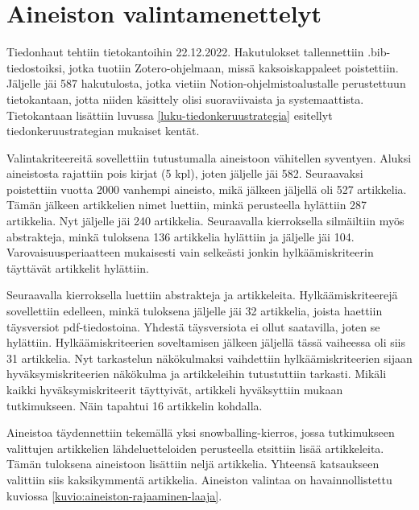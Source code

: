 \documentclass[utf8]{gradu3}
\begin{document}
\section{Aineiston valintamenettelyt}

Tiedonhaut tehtiin tietokantoihin 22.12.2022. Hakutulokset tallennettiin .bib-tiedostoiksi, jotka tuotiin Zotero-ohjelmaan, missä kaksoiskappaleet poistettiin. Jäljelle jäi 587 hakutulosta, jotka vietiin Notion-ohjelmistoalustalle perustettuun tietokantaan, jotta niiden käsittely olisi suoraviivaista ja systemaattista. Tietokantaan lisättiin luvussa \ref{luku-tiedonkeruustrategia} esitellyt tiedonkeruustrategian mukaiset kentät.

Valintakriteereitä sovellettiin tutustumalla aineistoon vähitellen syventyen. Aluksi  aineistosta rajattiin pois kirjat (5 kpl), joten jäljelle jäi 582. Seuraavaksi poistettiin vuotta 2000 vanhempi aineisto, mikä jälkeen jäljellä oli 527 artikkelia. Tämän jälkeen artikkelien nimet luettiin, minkä perusteella hylättiin 287 artikkelia. Nyt jäljelle jäi 240 artikkelia. Seuraavalla kierroksella silmäiltiin myös abstrakteja, minkä tuloksena 136 artikkelia hylättiin ja jäljelle jäi 104. Varovaisuusperiaatteen mukaisesti vain selkeästi jonkin hylkäämiskriteerin täyttävät artikkelit hylättiin.

Seuraavalla kierroksella luettiin abstrakteja ja artikkeleita. Hylkäämiskriteerejä sovellettiin edelleen, minkä tuloksena jäljelle jäi 32 artikkelia, joista haettiin täysversiot pdf-tiedostoina. Yhdestä täysversiota ei ollut saatavilla, joten se hylättiin. Hylkäämiskriteerien soveltamisen jälkeen jäljellä tässä vaiheessa oli siis 31 artikkelia. Nyt tarkastelun näkökulmaksi vaihdettiin hylkäämiskriteerien sijaan hyväksymiskriteerien näkökulma ja artikkeleihin tutustuttiin tarkasti. Mikäli kaikki hyväksymiskriteerit täyttyivät, artikkeli hyväksyttiin mukaan tutkimukseen. Näin tapahtui 16 artikkelin kohdalla.

Aineistoa täydennettiin tekemällä yksi snowballing-kierros, jossa tutkimukseen valittujen artikkelien lähdeluetteloiden perusteella etsittiin lisää artikkeleita. Tämän tuloksena aineistoon lisättiin neljä artikkelia. Yhteensä katsaukseen valittiin siis kaksikymmentä artikkelia. Aineiston valintaa on havainnollistettu kuviossa \ref{kuvio:aineiston-rajaaminen-laaja}.
\end{document}
